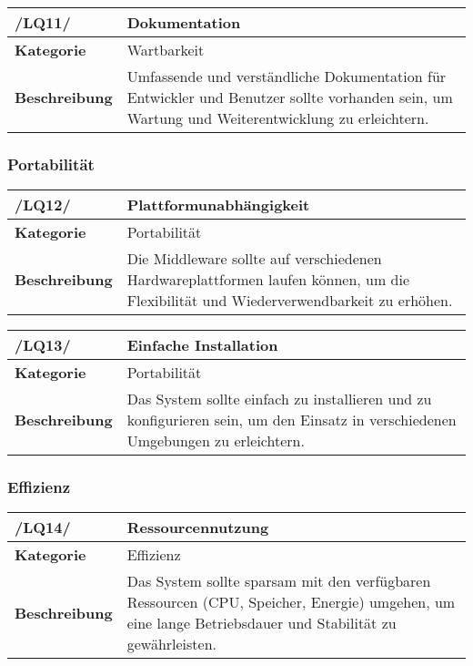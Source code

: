 \begin{table}[h!]
\begin{tabularx}{13cm}{|l|X|}
\hline
\textbf{/LQ11/} & \textbf{Dokumentation} \\ \hline
\textbf{Kategorie} & Wartbarkeit \\ \hline
\textbf{Beschreibung} & Umfassende und verständliche Dokumentation für Entwickler und Benutzer sollte vorhanden sein, um Wartung und Weiterentwicklung zu erleichtern. \\ \hline
\end{tabularx}
\end{table}

\subsubsection{Portabilität}

\begin{table}[h!]
\begin{tabularx}{13cm}{|l|X|}
\hline
\textbf{/LQ12/} & \textbf{Plattformunabhängigkeit} \\ \hline
\textbf{Kategorie} & Portabilität \\ \hline
\textbf{Beschreibung} & Die Middleware sollte auf verschiedenen Hardwareplattformen laufen können, um die Flexibilität und Wiederverwendbarkeit zu erhöhen. \\ \hline
\end{tabularx}
\end{table}

\begin{table}[h!]
\begin{tabularx}{13cm}{|l|X|}
\hline
\textbf{/LQ13/} & \textbf{Einfache Installation} \\ \hline
\textbf{Kategorie} & Portabilität \\ \hline
\textbf{Beschreibung} & Das System sollte einfach zu installieren und zu konfigurieren sein, um den Einsatz in verschiedenen Umgebungen zu erleichtern. \\ \hline
\end{tabularx}
\end{table}

\subsubsection{Effizienz}

\begin{table}[h!]
\begin{tabularx}{13cm}{|l|X|}
\hline
\textbf{/LQ14/} & \textbf{Ressourcennutzung} \\ \hline
\textbf{Kategorie} & Effizienz \\ \hline
\textbf{Beschreibung} & Das System sollte sparsam mit den verfügbaren Ressourcen (CPU, Speicher, Energie) umgehen, um eine lange Betriebsdauer und Stabilität zu gewährleisten. \\ \hline
\end{tabularx}
\end{table}

